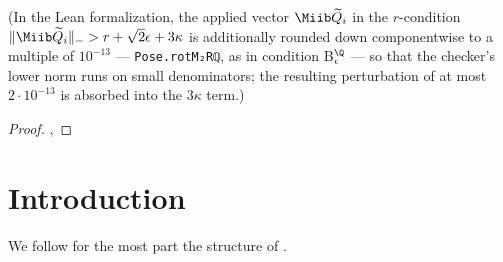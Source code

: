 \begin{theorem}
    (In the Lean formalization, the applied vector $\Miib \widetilde{Q}_i$ in the
    $r$-condition $\| \Miib \widetilde{Q}_i \|_{-} > r + \sqrt{2} \epsilon + 3\kappa$
    is additionally rounded down componentwise to a multiple of $10^{-13}$ ---
    \texttt{Pose.rotM₂Rℚ}, as in condition B$^{\Q}_\epsilon$ --- so that the
    checker's lower norm runs on small denominators; the resulting perturbation of
    at most $2 \cdot 10^{-13}$ is absorbed into the $3\kappa$ term.)
\end{theorem}

\begin{proof}
\leanok
{},
\end{proof}


\chapter{Introduction}
We follow for the most part the structure of \cite{polyhedron.without.rupert}.
















